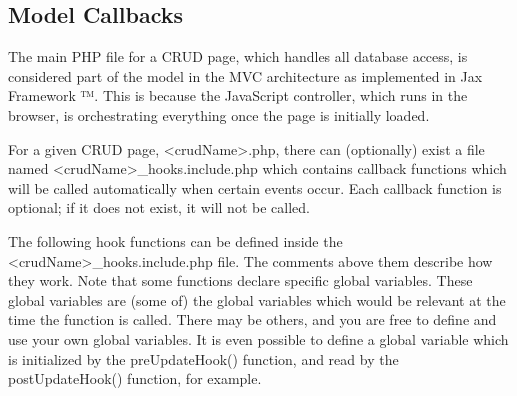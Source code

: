 \documentclass[letterpaper,10pt,english]{sphinxmanual}
\begin{document}
\subsection{Model Callbacks}
\label{jaxFrameworkGuide:model-callbacks}
The main PHP file for a CRUD page, which handles all database access, is considered part of the
model in the MVC architecture as implemented in Jax Framework ™.  This is because the
JavaScript controller, which runs in the browser, is orchestrating everything once the page is
initially loaded.

For a given CRUD page, \textless{}crudName\textgreater{}.php, there can (optionally) exist a file named
\textless{}crudName\textgreater{}\_hooks.include.php which contains callback functions which will be called automatically
when certain events occur.  Each callback function is optional; if it does not exist, it will not be
called.

The following hook functions can be defined inside the \textless{}crudName\textgreater{}\_hooks.include.php file.  The
comments above them describe how they work.  Note that some functions declare specific global
variables.  These global variables are (some of) the global variables which would be relevant at the
time the function is called.  There may be others, and you are free to define and use your own
global variables.  It is even possible to define a global variable which is initialized by the
preUpdateHook() function, and read by the postUpdateHook() function, for example.
\end{document}
